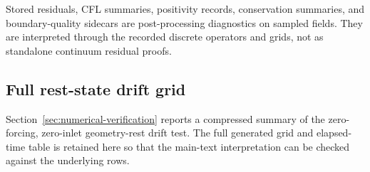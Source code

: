 Stored residuals, CFL summaries, positivity records, conservation summaries,
and boundary-quality sidecars are post-processing diagnostics on sampled fields.
They are interpreted through the recorded discrete operators and grids, not as
standalone continuum residual proofs.

\subsection{Full rest-state drift grid}
\label{app:num-full-rest-state-drift-grid}

Section~\ref{sec:numerical-verification} reports a compressed summary of the
zero-forcing, zero-inlet geometry-rest drift test. The full generated grid and
elapsed-time table is retained here so that the main-text interpretation can be
checked against the underlying rows.

